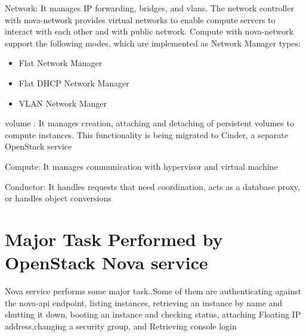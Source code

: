 \documentclass[9pt,twocolumn,twoside]{../../styles/osajnl}
\begin{document}
\begin{flushleft}

Network: It manages IP forwarding, bridges, and vlans. The network controller with nova-network provides virtual networks to enable compute servers to interact with each other and with public network. Compute with nova-network support the following modes, which are implemented as Network Manager types:
\begin{itemize}

\item Flat Network Manager

\item Flat DHCP Network Manager

\item VLAN Network Manger

\end{itemize}

\end{flushleft}


\begin{flushleft}

volume : It manages creation, attaching and detaching of persistent volumes to compute instances. This functionality is being migrated to Cinder, a separate OpenStack service

\end{flushleft}


\begin{flushleft}
Compute: It manages communication with hypervisor and virtual machine

\end{flushleft}


\begin{flushleft}

Conductor: It handles requests that need coordination, acts as a database proxy, or handles object conversions

\end{flushleft}




\section{Major Task Performed by OpenStack Nova service}

Nova service performs some major task.\cite{www-nova-ibm}.Some of them are authenticating against the nova-api endpoint, listing instances, retrieving an instance by name and shutting it down, booting an instance and checking status, attaching Floating IP address,changing a security group, and Retrieving console login
\end{document}
